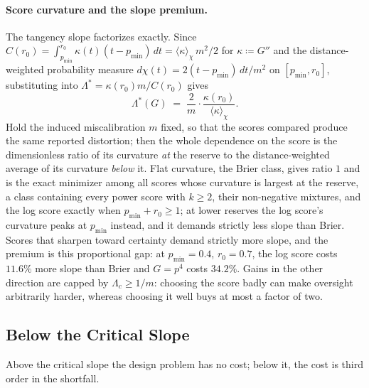 \documentclass[acmsmall,nonacm,screen]{acmart}
\theoremstyle{acmplain}%
\theoremstyle{acmdefinition}%
\numberwithin{equation}{section}
\begin{document}
\paragraph{Score curvature and the slope premium.}
The tangency slope factorizes exactly. Since $C(r_0) = \int_{p_{\min}}^{r_0} \kappa(t)(t-p_{\min})\,dt = \langle\kappa\rangle_\chi\, m^2/2$ for $\kappa \coloneqq G''$ and the distance-weighted probability measure $d\chi(t) = 2(t-p_{\min})\,dt/m^2$ on $[p_{\min},r_0]$, substituting into $\Lambda^* = \kappa(r_0)m/C(r_0)$ gives
\begin{equation}\label{eq:tilt-identity}
\Lambda^*(G) \;=\; \frac{2}{m}\cdot\frac{\kappa(r_0)}{\langle\kappa\rangle_\chi} .
\end{equation}
Hold the induced miscalibration $m$ fixed, so that the scores compared produce the same reported distortion; then the whole dependence on the score is the dimensionless ratio of its curvature \emph{at} the reserve to the distance-weighted average of its curvature \emph{below} it. Flat curvature, the Brier class, gives ratio $1$ and is the exact minimizer among all scores whose curvature is largest at the reserve, a class containing every power score with $k \ge 2$, their non-negative mixtures, and the log score exactly when $p_{\min} + r_0 \ge 1$; at lower reserves the log score's curvature peaks at $p_{\min}$ instead, and it demands strictly less slope than Brier. Scores that sharpen toward certainty demand strictly more slope, and the premium is this proportional gap: at $p_{\min} = 0.4$, $r_0 = 0.7$, the log score costs $11.6\%$ more slope than Brier and $G = p^4$ costs $34.2\%$. Gains in the other direction are capped by $\Lambda_c \ge 1/m$: choosing the score badly can make oversight arbitrarily harder, whereas choosing it well buys at most a factor of two.

\subsection{Below the Critical Slope}

Above the critical slope the design problem has no cost; below it, the cost is third order in the shortfall.
\end{document}
